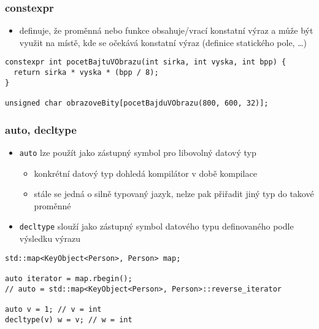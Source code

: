 \begin{frame}[fragile]
\frametitle{constexpr}

\begin{bonusblock}{}
\begin{itemize}
\item definuje, že proměnná nebo funkce obsahuje/vrací konstatní výraz a může být využit na místě, kde se očekává konstatní výraz (definice statického pole, \ldots)
\end{itemize}
\end{bonusblock}

\begin{yesblock}
\begin{lstlisting}
constexpr int pocetBajtuVObrazu(int sirka, int vyska, int bpp) {
  return sirka * vyska * (bpp / 8);
}

unsigned char obrazoveBity[pocetBajduVObrazu(800, 600, 32)];
\end{lstlisting}
\end{yesblock}
\end{frame}



\begin{frame}[fragile]
\frametitle{auto, decltype}

\begin{bonusblock}{}
\begin{itemize}
\item \lstinline|auto| lze použít jako zástupný symbol pro libovolný datový typ
\begin{itemize}
\item konkrétní datový typ dohledá kompilátor v době kompilace
\item stále se jedná o silně typovaný jazyk, nelze pak přiřadit jiný typ do takové proměnné
\end{itemize}
\item \lstinline|decltype| slouží jako zástupný symbol datového typu definovaného podle výsledku výrazu
\end{itemize}
\end{bonusblock}

\begin{yesblock}
\begin{lstlisting}
std::map<KeyObject<Person>, Person> map;

auto iterator = map.rbegin();
// auto = std::map<KeyObject<Person>, Person>::reverse_iterator

auto v = 1; // v = int
decltype(v) w = v; // w = int
\end{lstlisting}
\end{yesblock}
\end{frame}





